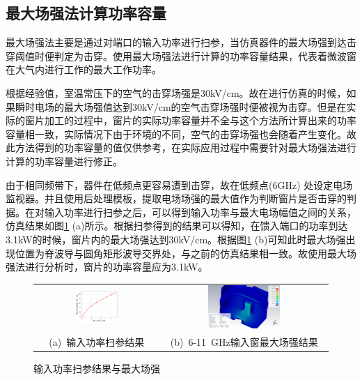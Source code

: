 \documentclass[master]{thesis-uestc}
\begin{document}
\subsection{最大场强法计算功率容量}\label{subsec:X最大场强功率容量}
最大场强法主要是通过对端口的输入功率进行扫参，当仿真器件的最大场强到达击穿阈值时便判定为击穿。使用最大场强法进行计算的功率容量结果，代表着微波窗在大气内进行工作的最大工作功率。

根据经验值，室温常压下的空气的击穿场强是30kV/cm。故在进行仿真的时候，如果瞬时电场的最大场强值达到30kV/cm的空气击穿场强时便被视为击穿。但是在实际的窗片加工的过程中，窗片的实际功率容量并不全与这个方法所计算出来的功率容量相一致，实际情况下由于环境的不同，空气的击穿场强也会随着产生变化。故此方法得到的功率容量的值仅供参考，在实际应用过程中需要针对最大场强法进行计算的功率容量进行修正。

由于相同频带下，器件在低频点更容易遭到击穿，故在低频点(6GHz) 处设定电场监视器。并且使用后处理模板，提取电场场强的最大值作为判断窗片是否击穿的判据。在对输入功率进行扫参之后，可以得到输入功率与最大电场幅值之间的关系，仿真结果如图\ref{fig:X输入窗最大场强结果} (a)所示。根据扫参得到的结果可以得知，在馈入端口的功率到达3.1kW的时候，窗片内的最大场强达到30kV/cm。根据图\ref{fig:X输入窗最大场强结果} (b)可知此时最大场强出现位置为脊波导与圆角矩形波导交界处，与之前的仿真结果相一致。故使用最大场强法进行分析时，窗片的功率容量应为3.1kW。

\begin{figure}[!htb]
    \small
    \centering
    \begin{tabular}{@{\ }c@{\ }c}
        \includegraphics[width=0.37\textwidth]{pic/chapter3/X输入功率VS最大场强.png} & 
        \hspace{5pt}
        \includegraphics[width=0.45\textwidth]{pic/chapter3/X频段最大功率场强.png}     \\
        \mbox{\small (a) 输入功率扫参结果}                                                                               & 
        \mbox{\small (b) 6-11 GHz输入窗最大场强结果}                                                                                  \\
    \end{tabular}
    \caption{输入功率扫参结果与最大场强}
    \label{fig:X输入窗最大场强结果}
\end{figure}
\end{document}
